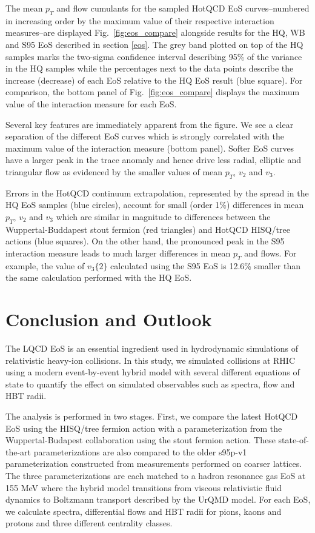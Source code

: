 \documentclass[aps,prc,reprint,amsmath,nofootinbib,superscriptaddress]{revtex4-1}
\begin{document}
The mean $p_T$ and flow cumulants for the sampled HotQCD EoS curves--numbered in increasing order by the maximum value of their respective interaction measures--are displayed Fig.~\ref{fig:eos_compare} alongside results for the HQ, WB and S95 EoS described in section \ref{eos}. The grey band plotted on top of the HQ samples marks the two-sigma confidence interval describing 95\% of the variance in the HQ samples while the percentages next to the data points describe the increase (decrease) of each EoS relative to the HQ EoS result (blue square). For comparison, the bottom panel of Fig.~\ref{fig:eos_compare} displays the maximum value of the interaction measure for each EoS.

Several key features are immediately apparent from the figure. We see a clear separation of the different EoS curves which is strongly correlated with the maximum value of the interaction measure (bottom panel). Softer EoS curves have a larger peak in the trace anomaly and hence drive less radial, elliptic and triangular flow as evidenced by the smaller values of 
mean $p_T$, $v_2$ and $v_3$.

Errors in the HotQCD continuum extrapolation, represented by the spread in the HQ EoS samples (blue circles), account for small (order 1\%) differences in mean $p_T$, $v_2$ and $v_3$ which are similar in magnitude to differences between the Wuppertal-Buddapest stout fermion (red triangles) and HotQCD HISQ/tree actions (blue squares). On the other hand, the pronounced peak in the S95 interaction measure leads to much larger differences in mean $p_T$ and flows. For example, the value of $v_3\{2\}$ calculated using the S95 EoS is 12.6\% smaller than the same calculation performed with the HQ EoS.

\section{Conclusion and Outlook}
\label{conclusion}

The LQCD EoS is an essential ingredient used in hydrodynamic simulations of relativistic heavy-ion collisions. In this study, we simulated collisions at RHIC using a modern event-by-event hybrid model with several different equations of state to quantify the effect on simulated observables such as spectra, flow and HBT radii. 

The analysis is performed in two stages. First, we compare the latest HotQCD EoS using the HISQ/tree fermion action with a parameterization from the Wuppertal-Budapest collaboration using the stout fermion action. These state-of-the-art parameterizations are also compared to the older s95p-v1 parameterization constructed from measurements performed on coarser lattices. The three parameterizations are each matched to a hadron resonance gas EoS at 155 MeV where the hybrid model transitions from viscous relativistic fluid dynamics to Boltzmann transport described by the UrQMD model. For each EoS, we calculate spectra, differential flows and HBT radii for pions, kaons and protons and three different centrality classes.
\end{document}
